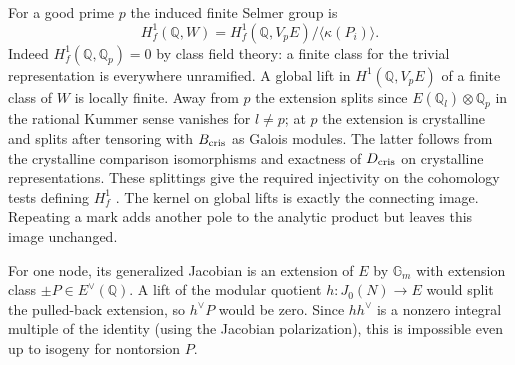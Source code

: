 \documentclass[11pt]{article}
\newcommand{\Q}{\mathbb Q}\newcommand{\F}{\mathbb F}\newcommand{\Sha}{\mathrm{Sha}}
\begin{document}
For a good prime $p$ the induced finite Selmer group is
\[
 H^1_f(\Q,W)=H^1_f(\Q,V_pE)/\langle\kappa(P_i)\rangle .
\]
Indeed $H^1_f(\Q,\Q_p)=0$ by class field theory: a finite class for
the trivial representation is everywhere unramified. A global lift in
$H^1(\Q,V_pE)$ of a finite class of $W$ is locally finite. Away from
$p$ the extension splits since $E(\Q_l)\otimes\Q_p$ in the rational
Kummer sense vanishes for $l\ne p$; at $p$ the extension is crystalline
and splits after tensoring with $B_{\rm cris}$ as Galois modules.
The latter follows from the crystalline comparison isomorphisms and
exactness of $D_{\rm cris}$ on crystalline representations. These
splittings give the required injectivity on the cohomology tests
defining $H^1_f$ \cite[\S3]{BK}. The kernel on global lifts is exactly
the connecting image. Repeating a mark adds another pole to the
analytic product but leaves this image unchanged.

For one node, its generalized Jacobian is an extension of $E$ by
$\mathbb G_m$ with extension class $\pm P\in E^\vee(\Q)$. A lift
of the modular quotient $h:J_0(N)\to E$ would split the pulled-back
extension, so $h^\vee P$ would be zero. Since $hh^\vee$ is a nonzero
integral multiple of the identity (using the Jacobian polarization),
this is impossible even up to isogeny for nontorsion $P$.
\end{document}
